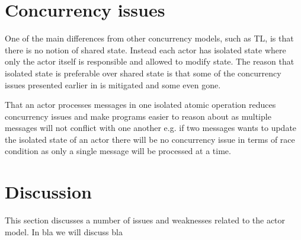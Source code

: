 \section{Concurrency issues}\label{sec:actor_con_issues}
One of the main differences from other concurrency models, such as \ac{TL}, is that there is no notion of shared state. Instead each actor has isolated state where only the actor itself is responsible and allowed to modify state. The reason that isolated state is preferable over shared state is that some of the concurrency issues presented earlier in  is mitigated and some even gone. 

That an actor processes messages in one isolated atomic operation reduces concurrency issues and make programs easier to reason about as multiple messages will not conflict with one another e.g. if two messages wants to update the isolated state of an actor there will be no concurrency issue in terms of race condition as only a single message will be processed at a time.









\section{Discussion}\label{sec:actor_discussion}
This section discusses a number of issues and weaknesses related to the actor model. In bla we will discuss bla 

